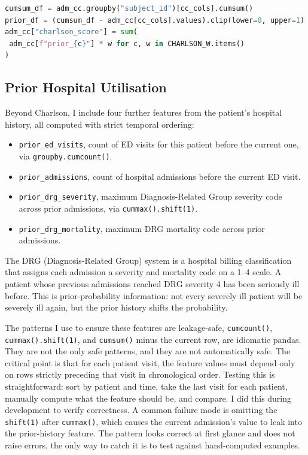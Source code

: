 \begin{lstlisting}[language=Python, caption={Leakage-safe Charlson computation. The cumulative sum is taken across admissions in chronological order, and the current admission's contribution is subtracted. The \texttt{clip} ensures binary values even when a condition appears in multiple prior admissions.}]
cumsum_df = adm_cc.groupby("subject_id")[cc_cols].cumsum()
prior_df = (cumsum_df - adm_cc[cc_cols].values).clip(lower=0, upper=1)
adm_cc["charlson_score"] = sum(
 adm_cc[f"prior_{c}"] * w for c, w in CHARLSON_W.items()
)
\end{lstlisting}

\subsection*{Prior Hospital Utilisation}

Beyond Charlson, I include four further features from the patient's hospital history, all computed with strict temporal ordering:

\begin{itemize}
 \item \texttt{prior\_ed\_visits}, count of ED visits for this patient before the current one, via \texttt{groupby.cumcount()}.
 \item \texttt{prior\_admissions}, count of hospital admissions before the current ED visit.
 \item \texttt{prior\_drg\_severity}, maximum Diagnosis-Related Group severity code across prior admissions, via \texttt{cummax().shift(1)}.
 \item \texttt{prior\_drg\_mortality}, maximum DRG mortality code across prior admissions.
\end{itemize}

The DRG (Diagnosis-Related Group) system is a hospital billing classification that assigns each admission a severity and mortality code on a 1--4 scale. A patient whose previous admissions reached DRG severity 4 has been seriously ill before. This is prior-probability information: not every severely ill patient will be severely ill again, but the prior history shifts the probability.

\begin{notebox}
The patterns I use to ensure these features are leakage-safe, \texttt{cumcount()}, \texttt{cummax().shift(1)}, and \texttt{cumsum()} minus the current row, are idiomatic pandas. They are not the only safe patterns, and they are not automatically safe. The critical point is that for each patient visit, the feature values must depend only on rows strictly preceding that visit in chronological order. Testing this is straightforward: sort by patient and time, take the last visit for each patient, manually compute what the feature should be, and compare. I did this during development to verify correctness. A common failure mode is omitting the \texttt{shift(1)} after \texttt{cummax()}, which causes the current admission's value to leak into the prior-history feature. The pattern looks correct at first glance and does not raise errors, the only way to catch it is to test against hand-computed examples.
\end{notebox}

